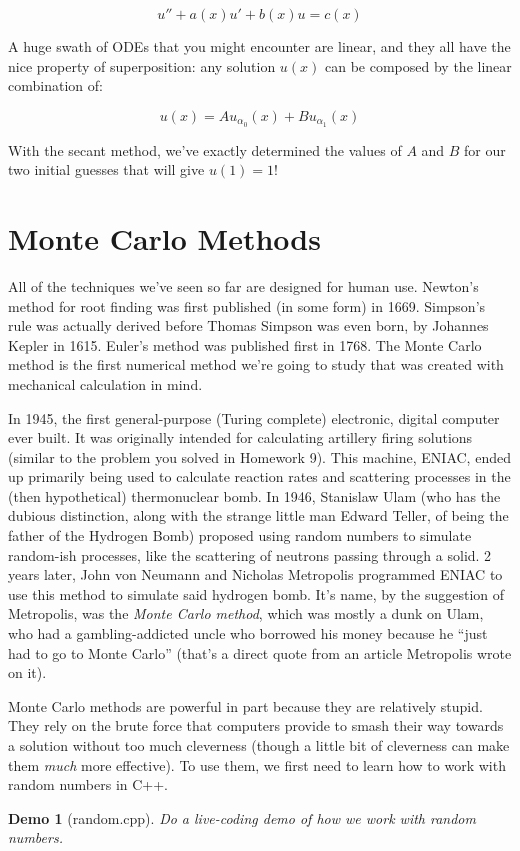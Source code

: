 \documentclass{article}
\theoremstyle{demo}
\newtheorem{demo}{Demo}[section]
\begin{document}
\begin{equation}
    u'' + a(x)u' + b(x)u = c(x)
\end{equation}

A huge swath of ODEs that you might encounter are linear, and they all have the
nice property of superposition: any solution $u(x)$ can be composed by the
linear combination of:

\begin{equation}
    u(x) = Au_{\alpha_0}(x) + Bu_{\alpha_1}(x)
\end{equation}

With the secant method, we've exactly determined the values of $A$ and $B$ for
our two initial guesses that will give $u(1) = 1$!

\section{Monte Carlo Methods}
All of the techniques we've seen so far are designed for human use.  Newton's
method for root finding was first published (in some form) in 1669.  Simpson's
rule was actually derived before Thomas Simpson was even born, by Johannes
Kepler in 1615.  Euler's method was published first in 1768.  The Monte Carlo
method is the first numerical method we're going to study that was created with
mechanical calculation in mind.  

In 1945, the first general-purpose (Turing complete) electronic, digital
computer ever built.  It was originally intended for calculating artillery
firing solutions (similar to the problem you solved in Homework 9).  This
machine, ENIAC, ended up primarily being used to calculate reaction rates and
scattering processes in the (then hypothetical) thermonuclear bomb.  In 1946,
Stanislaw Ulam (who has the dubious distinction, along with the strange little
man Edward Teller, of being the father of the Hydrogen Bomb) proposed using
random numbers to simulate random-ish processes, like the scattering of neutrons
passing through a solid.  2 years later, John von Neumann and Nicholas
Metropolis programmed ENIAC to use this method to simulate said hydrogen bomb.
It's name, by the suggestion of Metropolis, was the \textit{Monte
Carlo method}, which was mostly a dunk on Ulam, who had a gambling-addicted
uncle who borrowed his money because he ``just had to go to Monte Carlo''
(that's a direct quote from an article Metropolis wrote on it).

Monte Carlo methods are powerful in part because they are relatively stupid.
They rely on the brute force that computers provide to smash their way towards a
solution without too much cleverness (though a little bit of cleverness can make
them \textit{much} more effective).  To use them, we first need to learn how to
work with random numbers in C++.

\begin{demo}[random.cpp]
    Do a live-coding demo of how we work with random numbers.
\end{demo}
\end{document}
